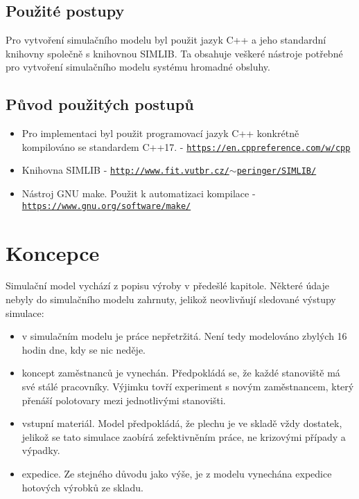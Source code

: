 \documentclass[11pt, a4paper]{article}
\begin{document}
\subsection{Použité postupy}
Pro vytvoření simulačního modelu byl použit jazyk C++ a jeho standardní knihovny společně s knihovnou SIMLIB\cite{simlib}. Ta obsahuje veškeré nástroje potřebné pro vytvoření simulačního modelu systému hromadné obsluhy\cite{ims}.
\subsection{Původ použitých postupů}
\begin{itemize}
    \item Pro implementaci byl použit programovací jazyk C++ konkrétně kompilováno se standardem C++17. - \href{https://en.cppreference.com/w/cpp}{\texttt{https://en.cppreference.com/w/cpp}}
    \item Knihovna SIMLIB -  \href{http://www.fit.vutbr.cz/~peringer/SIMLIB/}{\texttt{http://www.fit.vutbr.cz/$\sim$peringer/SIMLIB/}}
    \item Nástroj GNU make. Použit k automatizaci kompilace -  \href{https://www.gnu.org/software/make/}{\texttt{https://www.gnu.org/software/make/}}
\end{itemize}

\section{Koncepce}

Simulační model vychází z popisu výroby v předešlé kapitole. Některé údaje nebyly do simulačního modelu zahrnuty, jelikož neovlivňují sledované výstupy simulace:
\begin{itemize}
    \item v simulačním modelu je práce nepřetržitá. Není tedy modelováno zbylých 16 hodin dne, kdy se nic neděje.
    \item koncept zaměstnanců je vynechán. Předpokládá se, že každé stanoviště má své stálé pracovníky. Výjimku tovří experiment s novým zaměstnancem, který přenáší polotovary mezi jednotlivými stanovišti.
    \item vstupní materiál. Model předpokládá, že plechu je ve skladě vždy dostatek, jelikož se tato simulace zaobírá zefektivněním práce, ne krizovými případy a výpadky.
    \item expedice. Ze stejného důvodu jako výše, je z modelu vynechána expedice hotových výrobků ze skladu.
\end{itemize}
\end{document}
